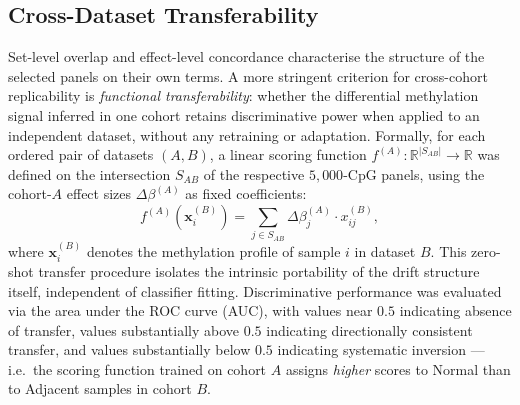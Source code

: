 \subsection{Cross-Dataset Transferability}
\label{sec:inter_fs_transfer}

Set-level overlap and effect-level concordance characterise the
structure of the selected panels on their own terms.
A more stringent criterion for cross-cohort replicability is
\emph{functional transferability}: whether the differential methylation
signal inferred in one cohort retains discriminative power when applied
to an independent dataset, without any retraining or adaptation.
Formally, for each ordered pair of datasets $(A, B)$, a linear scoring
function $f^{(A)}: \mathbb{R}^{|S_{AB}|} \to \mathbb{R}$ was defined on
the intersection $S_{AB}$ of the respective $5{,}000$-CpG panels, using
the cohort-$A$ effect sizes $\Delta\beta^{(A)}$ as fixed coefficients:
\begin{equation}
  f^{(A)}(\mathbf{x}^{(B)}_i) = \sum_{j \in S_{AB}}
  \Delta\beta^{(A)}_j \cdot x^{(B)}_{ij},
  \label{eq:transfer_score}
\end{equation}
where $\mathbf{x}^{(B)}_i$ denotes the methylation profile of sample $i$
in dataset $B$.
This zero-shot transfer procedure isolates the intrinsic portability of
the drift structure itself, independent of classifier fitting.
Discriminative performance was evaluated via the area under the
ROC curve (AUC), with values near $0.5$ indicating absence of transfer,
values substantially above $0.5$ indicating directionally consistent
transfer, and values substantially below $0.5$ indicating systematic
inversion — i.e.\ the scoring function trained on cohort $A$ assigns
\emph{higher} scores to Normal than to Adjacent samples in cohort $B$.

